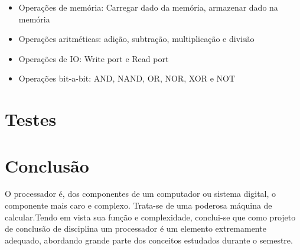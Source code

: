 \documentclass[11pt]{report}
\begin{document}
\begin{itemize}
	\item Operações de memória: Carregar dado da memória, armazenar dado na memória
	\item Operações aritméticas: adição, subtração, multiplicação e divisão
	\item Operações de IO: Write port e Read port
	\item Operações bit-a-bit: AND, NAND, OR, NOR, XOR e NOT
\end{itemize}


\chapter{Testes}

\chapter{Conclusão}

O processador é, dos componentes de um computador ou sistema digital, o componente mais caro e complexo. Trata-se de uma poderosa máquina de calcular.Tendo em vista sua função e complexidade, conclui-se que como projeto de conclusão de disciplina um processador é um elemento extremamente adequado, abordando grande parte dos conceitos estudados durante o semestre.
\end{document}

